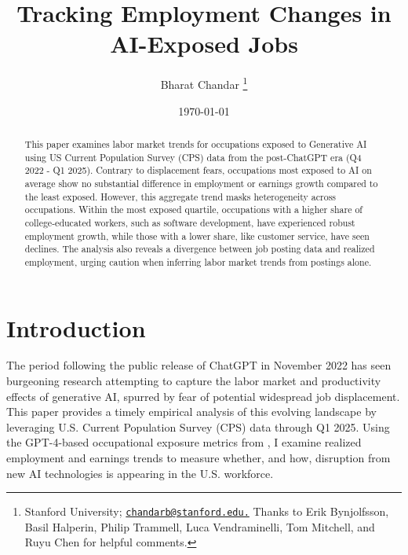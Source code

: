 \documentclass[12pt]{article}
\date{}
\title{Tracking Employment Changes in AI-Exposed Jobs}
\author{Bharat Chandar \footnote{Stanford University; \href{mailto:email}{\texttt{chandarb@stanford.edu.}} Thanks to Erik Bynjolfsson, Basil Halperin, Philip Trammell, Luca Vendraminelli, Tom Mitchell, and Ruyu Chen for helpful comments.}}
\date{\today}
\numberwithin{equation}{section}
\theoremstyle{theorem}\newcustomtheorem{theorem}{{\bf\sc Theorem}}
\theoremstyle{definition}\newcustomtheorem{assumption}{{\bf\sc Assumption}}
\theoremstyle{theorem} \newcustomtheorem{proposition}{{\bf\sc Proposition}}
\begin{document}
\maketitle

\begin{abstract}
	This paper examines labor market trends for occupations exposed to Generative AI using US Current Population Survey (CPS) data from the post-ChatGPT era (Q4 2022 - Q1 2025). Contrary to displacement fears, occupations most exposed to AI on average show no substantial difference in employment or earnings growth compared to the least exposed. However, this aggregate trend masks heterogeneity across occupations. Within the most exposed quartile, occupations with a higher share of college-educated workers, such as software development, have experienced robust employment growth, while those with a lower share, like customer service, have seen declines. The analysis also reveals a divergence between job posting data and realized employment, urging caution when inferring labor market trends from postings alone.
\end{abstract}

\setlength{\abovedisplayskip}{6pt}
\setlength{\belowdisplayskip}{6pt}

\section{Introduction}

The period following the public release of ChatGPT in November 2022 has seen burgeoning research attempting to capture the labor market and productivity effects of generative AI, spurred by fear of potential widespread job displacement. This paper provides a timely empirical analysis of this evolving landscape by leveraging U.S. Current Population Survey (CPS) data through Q1 2025. Using the GPT-4-based occupational exposure metrics from \citet{eloundou_gpts_2024}, I examine realized employment and earnings trends to measure whether, and how, disruption from new AI technologies is appearing in the U.S. workforce.
\end{document}
